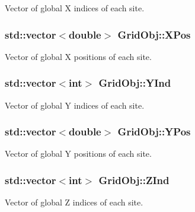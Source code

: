 Vector of global X indices of each site. 

\subsubsection[{\texorpdfstring{X\+Pos}{XPos}}]{\setlength{\rightskip}{0pt plus 5cm}std\+::vector$<$double$>$ Grid\+Obj\+::\+X\+Pos}\hypertarget{class_grid_obj_af31df133bf9419da6222a0dbb4e54bab}{}\label{class_grid_obj_af31df133bf9419da6222a0dbb4e54bab}


Vector of global X positions of each site. 

\subsubsection[{\texorpdfstring{Y\+Ind}{YInd}}]{\setlength{\rightskip}{0pt plus 5cm}std\+::vector$<$int$>$ Grid\+Obj\+::\+Y\+Ind}\hypertarget{class_grid_obj_acf1d07b290887f0d380d046a1d698f0e}{}\label{class_grid_obj_acf1d07b290887f0d380d046a1d698f0e}


Vector of global Y indices of each site. 

\subsubsection[{\texorpdfstring{Y\+Pos}{YPos}}]{\setlength{\rightskip}{0pt plus 5cm}std\+::vector$<$double$>$ Grid\+Obj\+::\+Y\+Pos}\hypertarget{class_grid_obj_a2bd4e9b575377b8e76e5ebe7a3a31194}{}\label{class_grid_obj_a2bd4e9b575377b8e76e5ebe7a3a31194}


Vector of global Y positions of each site. 

\subsubsection[{\texorpdfstring{Z\+Ind}{ZInd}}]{\setlength{\rightskip}{0pt plus 5cm}std\+::vector$<$int$>$ Grid\+Obj\+::\+Z\+Ind}\hypertarget{class_grid_obj_aef85a27cb2bca6b268469ee96470bb35}{}\label{class_grid_obj_aef85a27cb2bca6b268469ee96470bb35}


Vector of global Z indices of each site. 

